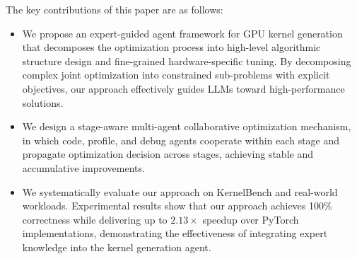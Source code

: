 The key contributions of this paper are as follows:
\begin{itemize}
\item We propose an expert-guided agent framework for GPU kernel generation that decomposes the optimization process into high-level algorithmic structure design and fine-grained hardware-specific tuning. By decomposing complex joint optimization into constrained sub-problems with explicit objectives, our approach effectively guides LLMs toward high-performance solutions.

\item We design a stage-aware multi-agent collaborative optimization mechanism, in which code, profile, and debug agents cooperate within each stage and propagate optimization decision across stages, achieving stable and accumulative improvements.

\item We systematically evaluate our approach on KernelBench and real-world workloads. Experimental results show that our approach achieves 100\% correctness while delivering up to $2.13\times$ speedup over PyTorch implementations, demonstrating the effectiveness of integrating expert knowledge into the kernel generation agent.
\end{itemize}